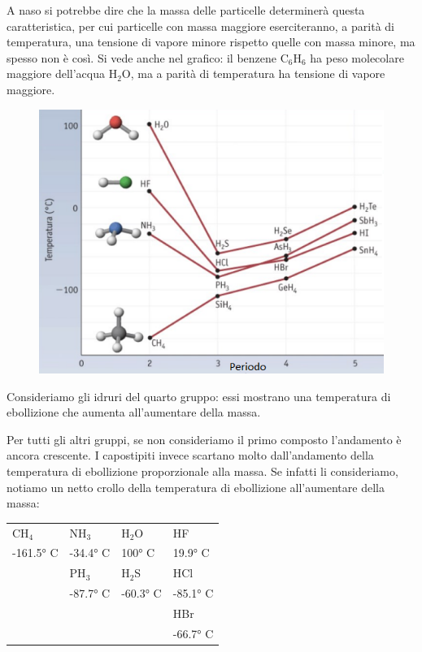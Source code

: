 A naso si potrebbe dire che la massa delle particelle determinerà questa caratteristica, per cui particelle con massa maggiore eserciteranno, a parità di temperatura, una tensione di vapore minore rispetto quelle con massa minore, ma spesso non è così. Si vede anche nel grafico: il benzene C$_6$H$_6$ ha peso molecolare maggiore dell'acqua H$_2$O, ma a parità di temperatura ha tensione di vapore maggiore.

\begin{figure}[htp]
    \centering
    \includegraphics[width=12cm]{immagini/temperature_ebollizione.png}
\end{figure}

Consideriamo gli idruri del quarto gruppo: essi mostrano una temperatura di ebollizione che aumenta all'aumentare della massa.

Per tutti gli altri gruppi, se non consideriamo il primo composto l'andamento è ancora crescente. I capostipiti invece scartano molto dall'andamento della temperatura di ebollizione proporzionale alla massa. Se infatti li consideriamo, notiamo un netto crollo della temperatura di ebollizione all'aumentare della massa:

\begin{center}
    \begin{tabular}{m{2cm}m{2cm}m{2cm}m{2cm}}
    CH$_4$ & NH$_3$ & H$_2$O & HF\\[0.8ex]
    \hspace{-0.4cm}-161.5° C & \hspace{-0.3cm}-34.4° C & \hspace{-0.2cm}100° C & \hspace{-0.3cm}19.9° C\\[0.8ex]
    & PH$_3$ & H$_2$S & HCl\\[0.8ex]
    & \hspace{-0.3cm}-87.7° C & \hspace{-0.3cm}-60.3° C & \hspace{-0.3cm}-85.1° C\\[0.8ex]
    &&& HBr\\[0.8ex]
    &&& \hspace{-0.3cm}-66.7° C
    \end{tabular}
\end{center}

